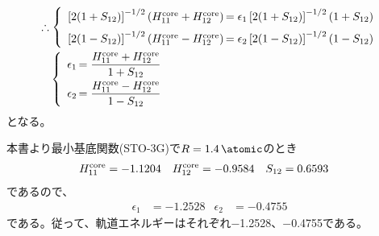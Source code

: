 \begin{align}
&
	\therefore
	\left\{
	\begin{array}{r@{\,}l}
			\left[2(1+S_{12})\right]^{-1/2}
			(H^{\rm core}_{11} +H^{\rm core}_{12})
		&=
			\epsilon_1
			\left[2(1+S_{12})\right]^{-1/2}
			(1+S_{12}) \\[2mm]
			\left[2(1-S_{12})\right]^{-1/2}
			(H^{\rm core}_{11} -H^{\rm core}_{12})
		&=
			\epsilon_2
			\left[2(1-S_{12})\right]^{-1/2}
			(1-S_{12})
	\end{array}
	\right. \\
%
%
&\quad
	\left\{
	\begin{array}{r@{\,}l}
			\epsilon_1
		&=
			\dfrac{
				H^{\rm core}_{11} +H^{\rm core}_{12}
			}{
				1 +S_{12}
			} \\[3mm]
			\epsilon_2
		&=
			\dfrac{
				H^{\rm core}_{11} -H^{\rm core}_{12}
			}{
				1 -S_{12}
			}
	\end{array}
	\right.
\end{align}
となる。

本書より最小基底関数(STO-3G)で$R=\SI{1.4}{\atomic}$のとき
\begin{align}
	H^{\rm core}_{11}
&=
	-1.1204 &
%
	H^{\rm core}_{12}
&=
	-0.9584 &
%
	S_{12}
&=
	0.6593
\end{align}
であるので、
\begin{align}
	\epsilon_1
&=
	-1.2528 &
%
	\epsilon_2
&=
	-0.4755
\end{align}
である。従って、軌道エネルギーはそれぞれ\SI{-1.2528}{\atomic}、\SI{-0.4755}{\atomic}である。